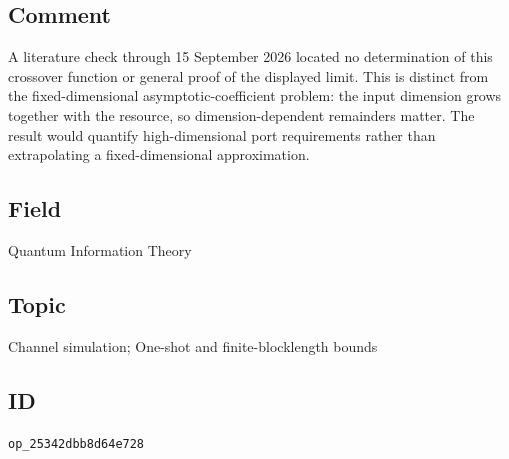 \subsection*{Comment}

A literature check through 15 September 2026 located no determination of this crossover function or general proof of the displayed limit. This is distinct from the fixed-dimensional asymptotic-coefficient problem: the input dimension grows together with the resource, so dimension-dependent remainders matter. The result would quantify high-dimensional port requirements rather than extrapolating a fixed-dimensional approximation.

\subsection*{Field}

Quantum Information Theory

\subsection*{Topic}

Channel simulation; One-shot and finite-blocklength bounds

\subsection*{ID}

\texttt{op\_25342dbb8d64e728}
